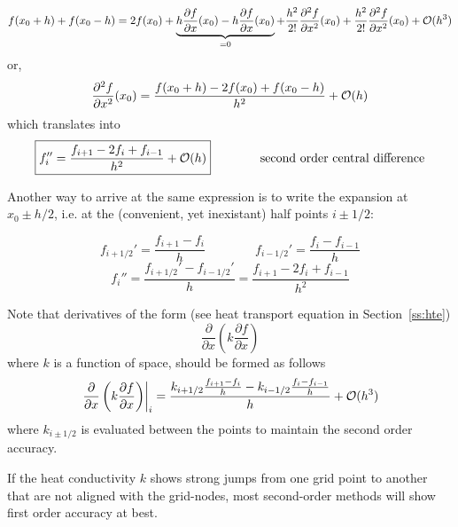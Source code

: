 \[
f(x_0+h) + f(x_0-h) =2 f(x_0)+ 
\underbrace{h \frac{\partial f}{\partial x}(x_0)   
-h \frac{\partial f}{\partial x}(x_0)}_{=0}  + 
\frac{h^2}{2!} \frac{\partial^2 f}{\partial x^2}(x_0)  +
\frac{h^2}{2!} \frac{\partial^2 f}{\partial x^2}(x_0)  
+ {\cal O}(h^{3})
\]
or, 
\[
\frac{\partial^2 f}{\partial x^2}(x_0)  =
\frac{f(x_0+h) -2f(x_0) + f(x_0-h) }{h^2}
+ {\cal O}(h)
\] 
which translates into
\[
\boxed{
f_{i}''=\frac{f_{i+1}-2f_i+f_{i-1}}{h^2} + {\cal O}(h)
}
\qquad
\qquad
\text{second order central difference}
\]

Another way to arrive at the same expression is to write the expansion at $x_0 \pm h/2$, 
i.e. at the (convenient, yet inexistant) half points $i\pm 1/2$:

\begin{center}

\end{center}


%     
%

\[
f_{i+1/2}'=\frac{f_{i+1}-f_i}{h}
\quad\quad
\quad\quad
f_{i-1/2}'=\frac{f_{i}-f_{i-1}}{h}
\]
\[
f_i''=\frac{f_{i+1/2}'-f_{i-1/2}'}{h} = 
\frac{f_{i+1}-2f_i+f_{i-1}}{h^2} 
\]

Note that derivatives of the form (see heat transport equation in Section~\ref{ss:hte}) 
\[
\frac{\partial }{\partial x} \left(  k  \frac{\partial f}{\partial x} \right)
\]
where $k$ is a function of space, should be formed as follows
\[
\left. \frac{\partial }{\partial x} \left(  k  \frac{\partial f}{\partial x} \right) \right|_i
=
\frac{ k_{i+1/2} \frac{f_{i+1}-f_i}{h} - k_{i-1/2}\frac{f_i-f_{i-1}}{h}    }{h} + {\cal O}(h^3)
\]
where $k_{i\pm 1/2}$ is evaluated between the points to maintain the second order accuracy.

\begin{remark}
If the heat conductivity $k$ shows strong jumps from one grid point to another that are not aligned with
the grid-nodes, most second-order methods will show first order accuracy at best.
\end{remark}






